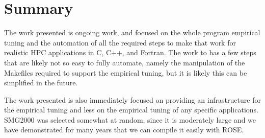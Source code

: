 \section{Summary}

   The work presented is ongoing work, and focused on the whole program empirical tuning
and the automation of all the required steps to make that work for realistic HPC applications
in C, C++, and Fortran.  The work to has a few steps that are likely not so easy to fully
automate, namely the manipulation of the Makefiles required to support the empirical
tuning, but it is likely this can be simplified in the future.

The work presented is also immediately focused on providing an infrastructure for 
the empirical tuning and less on the empirical tuning of any specific applications.
SMG2000 was selected somewhat at random, since it is moderately large and 
we have demonstrated for many years that we can compile it easily with ROSE.

